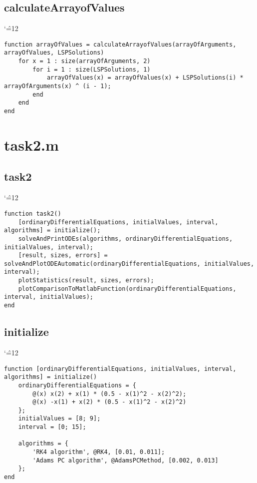\documentclass[12pt]{report}
\newenvironment{simplechar}{%
   \catcode`\^=12
}{}
\begin{document}
\subsection{calculateArrayofValues}
\begin{simplechar}
\begin{lstlisting}
function arrayOfValues = calculateArrayofValues(arrayOfArguments, arrayOfValues, LSPSolutions)
    for x = 1 : size(arrayOfArguments, 2)
        for i = 1 : size(LSPSolutions, 1)
            arrayOfValues(x) = arrayOfValues(x) + LSPSolutions(i) * arrayOfArguments(x) ^ (i - 1);
        end
    end
end
\end{lstlisting}
\end{simplechar}

\section{task2.m}
\subsection{task2}
\begin{simplechar}
\begin{lstlisting}
function task2()
    [ordinaryDifferentialEquations, initialValues, interval, algorithms] = initialize();
    solveAndPrintODEs(algorithms, ordinaryDifferentialEquations, initialValues, interval);
    [result, sizes, errors] = solveAndPlotODEAutomatic(ordinaryDifferentialEquations, initialValues, interval);
    plotStatistics(result, sizes, errors);
    plotComparisonToMatlabFunction(ordinaryDifferentialEquations, interval, initialValues);
end
\end{lstlisting}
\end{simplechar}

\subsection{initialize}
\begin{simplechar}
\begin{lstlisting}
function [ordinaryDifferentialEquations, initialValues, interval, algorithms] = initialize()
    ordinaryDifferentialEquations = {
        @(x) x(2) + x(1) * (0.5 - x(1)^2 - x(2)^2);
        @(x) -x(1) + x(2) * (0.5 - x(1)^2 - x(2)^2)
    };
    initialValues = [8; 9];
    interval = [0; 15];

    algorithms = {
        'RK4 algorithm', @RK4, [0.01, 0.011];
        'Adams PC algorithm', @AdamsPCMethod, [0.002, 0.013]
    };
end
\end{lstlisting}
\end{simplechar}
\end{document}
